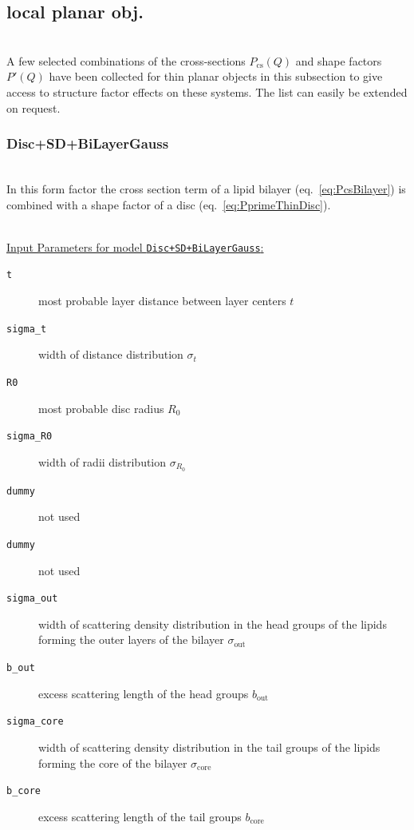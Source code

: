 \clearpage
\subsection{local planar  obj.} ~\\
\label{plugin:LocalPlanar)}
A few selected combinations of the cross-sections $P_\mathrm{cs}(Q)$ and shape factors $P'(Q)$ have been collected for thin planar objects in this subsection to give access to structure factor effects on these systems. The list can easily be extended on request.

\vspace{5mm}

\noindent
\subsubsection{Disc+SD+BiLayerGauss} ~\\

\noindent
In this form factor the cross section term of a lipid bilayer (eq.\ \ref{eq:PcsBilayer}) is combined with a shape factor of a disc (eq.\ \ref{eq:PprimeThinDisc}).

\vspace{5mm}

\hspace{1pt}\\
\underline{Input Parameters for model \texttt{Disc+SD+BiLayerGauss}:}\\
\begin{description}
\item[\texttt{t}] most probable layer distance between layer centers $t$
\item[\texttt{sigma\_t}] width of distance distribution $\sigma_t$
\item[\texttt{R0}] most probable disc radius $R_0$
\item[\texttt{sigma\_R0}] width of radii distribution $\sigma_{R_0}$
\item[\texttt{dummy}] not used
\item[\texttt{dummy}] not used
\item[\texttt{sigma\_out}] width of scattering density distribution in the head groups of the lipids forming the outer layers of the bilayer $\sigma_\mathrm{out}$
\item[\texttt{b\_out}] excess scattering length of the head groups $b_\mathrm{out}$
\item[\texttt{sigma\_core}] width of scattering density distribution in the tail groups of the lipids forming the core of the bilayer $\sigma_\mathrm{core}$
\item[\texttt{b\_core}] excess scattering length of the tail groups $b_\mathrm{core}$
\end{description}

